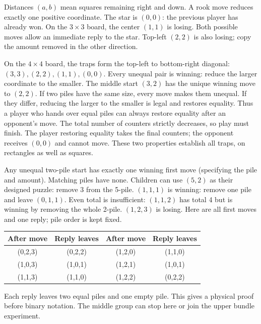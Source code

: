 \documentclass[11pt]{article}
\begin{document}
Distances $(a,b)$ mean squares remaining right and down. A rook move reduces exactly one positive coordinate. The star is $(0,0)$: the previous player has already won. On the $3\times3$ board, the center $(1,1)$ is losing. Both possible moves allow an immediate reply to the star. Top-left $(2,2)$ is also losing; copy the amount removed in the other direction.

On the $4\times4$ board, the traps form the top-left to bottom-right diagonal: $(3,3),(2,2),(1,1),(0,0)$. Every unequal pair is winning: reduce the larger coordinate to the smaller. The middle start $(3,2)$ has the unique winning move to $(2,2)$.
If two piles have the same size, every move makes them unequal. If they differ, reducing the larger to the smaller is legal and restores equality. Thus a player who hands over equal piles can always restore equality after an opponent's move. The total number of counters strictly decreases, so play must finish. The player restoring equality takes the final counters; the opponent receives $(0,0)$ and cannot move. These two properties establish all traps, on rectangles as well as squares.

Any unequal two-pile start has exactly one winning first move (specifying the pile and amount). Matching piles have none. Children can use $(5,2)$ as their designed puzzle: remove 3 from the 5-pile.
$(1,1,1)$ is winning: remove one pile and leave $(0,1,1)$. Even total is insufficient: $(1,1,2)$ has total 4 but is winning by removing the whole 2-pile. $(1,2,3)$ is losing. Here are all first moves and one reply; pile order is kept fixed.
\begin{center}\renewcommand{\arraystretch}{1.35}\begin{tabular}{c|c@{\qquad}c|c}After move&Reply leaves&After move&Reply leaves\\\hline(0,2,3)&(0,2,2)&(1,2,0)&(1,1,0)\\(1,0,3)&(1,0,1)&(1,2,1)&(1,0,1)\\(1,1,3)&(1,1,0)&(1,2,2)&(0,2,2)\end{tabular}\end{center}
Each reply leaves two equal piles and one empty pile. This gives a physical proof before binary notation. The middle group can stop here or join the upper bundle experiment.

\newpage
\end{document}
